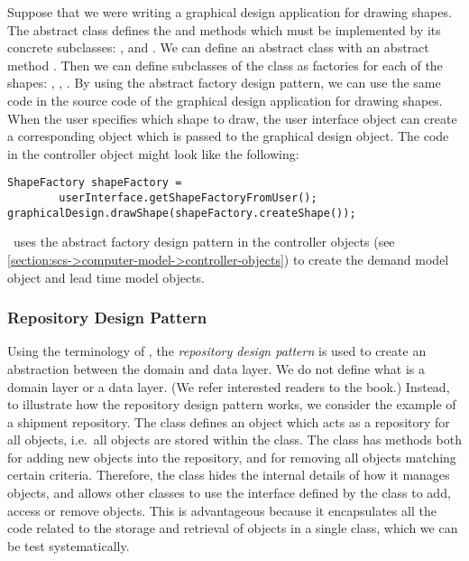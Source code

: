 Suppose that we were writing
a graphical design application for drawing shapes.
The abstract  class
defines the  and  methods
which must be implemented by its concrete subclasses:
,  and .
We can define an abstract  class
with an abstract method .
Then we can define subclasses of the  class
as factories for each of the shapes:
, , .
By using the abstract factory design pattern,
we can use the same code
in the source code of the graphical design application
for drawing shapes.
When the user specifies which shape to draw,
the user interface object can create
a corresponding  object
which is passed to the graphical design object.
The code in the controller object might look like the following:
\begin{lstlisting}
ShapeFactory shapeFactory = 
        userInterface.getShapeFactoryFromUser();
graphicalDesign.drawShape(shapeFactory.createShape());
\end{lstlisting}

\scs\ uses the abstract factory design pattern
in the controller objects
(see \autoref{section:scs->computer-model->controller-objects})
to create the demand model object and lead time model objects.





\subsubsection{Repository Design Pattern}

Using the terminology of \cite{evans-2004},
the \emph{repository design pattern}
is used to create an abstraction between the domain and data layer.
We do not define what is a domain layer or a data layer.
(We refer interested readers to the book.)
Instead, to illustrate how the repository design pattern works,
we consider the example of a shipment repository.
The  class defines an object
which acts as a repository for all  objects,
i.e.\ all  objects
are stored within the  class.
The  class has methods
both for adding new  objects into the repository,
and for removing all  objects matching certain criteria.
Therefore, the  class
hides the internal details of how it manages  objects,
and allows other classes to use
the interface defined by the  class
to add, access or remove  objects.
This is advantageous because it encapsulates all the code
related to the storage and retrieval of  objects
in a single  class,
which we can be test systematically.

